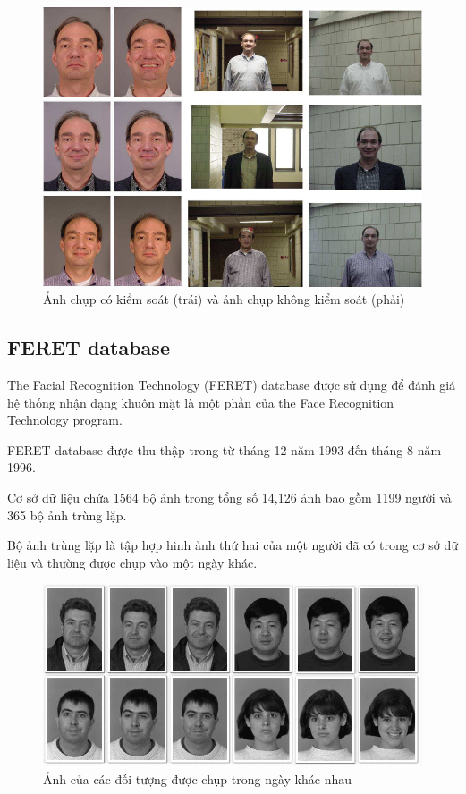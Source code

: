 \documentclass[a4paper, 12pt]{article}
\begin{document}
    \begin{figure}[H]
        \begin{center}
            \includegraphics[scale=0.5]{img/FRGC.png}
            \caption{Ảnh chụp có kiểm soát (trái) và ảnh chụp không kiểm soát (phải)}
        \end{center}
    \end{figure}

\subsection{FERET database}
The Facial Recognition Technology (FERET) database được sử dụng để đánh giá hệ thống nhận dạng khuôn mặt là một phần của the Face Recognition Technology program.

FERET database được thu thập trong  từ tháng 12 năm 1993 đến tháng 8 năm 1996. 

Cơ sở dữ liệu chứa 1564 bộ ảnh trong tổng số 14,126 ảnh bao gồm 1199 người và 365 bộ ảnh trùng lặp.

Bộ ảnh trùng lặp là tập hợp hình ảnh thứ hai của một người đã có trong cơ sở dữ liệu và thường được chụp vào một ngày khác.

    \begin{figure}[H]
        \begin{center}
            \includegraphics[scale=0.5]{img/FERET.png}
            \caption{Ảnh của các đối tượng được chụp trong ngày khác nhau}
        \end{center}
    \end{figure}
\end{document}
